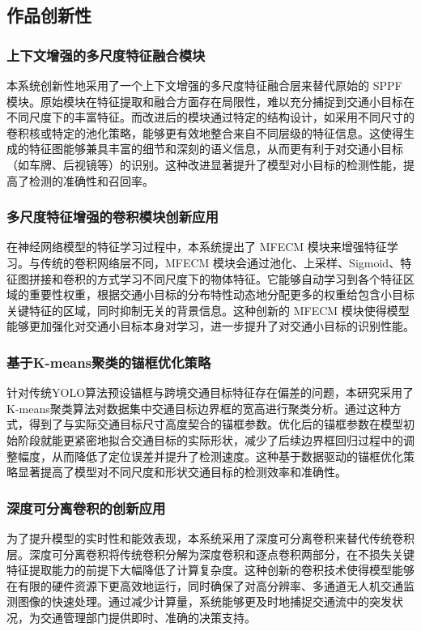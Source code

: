 \documentclass[runningheads]{llncs}
\begin{document}
\subsection{作品创新性}

\subsubsection{上下文增强的多尺度特征融合模块}
本系统创新性地采用了一个上下文增强的多尺度特征融合层来替代原始的 SPPF 模块。原始模块在特征提取和融合方面存在局限性，难以充分捕捉到交通小目标在不同尺度下的丰富特征。而改进后的模块通过特定的结构设计，如采用不同尺寸的卷积核或特定的池化策略，能够更有效地整合来自不同层级的特征信息。这使得生成的特征图能够兼具丰富的细节和深刻的语义信息，从而更有利于对交通小目标（如车牌、后视镜等）的识别。这种改进显著提升了模型对小目标的检测性能，提高了检测的准确性和召回率。

\subsubsection{多尺度特征增强的卷积模块创新应用}
在神经网络模型的特征学习过程中，本系统提出了 MFECM 模块来增强特征学习。与传统的卷积网络层不同，MFECM 模块会通过池化、上采样、Sigmoid、特征图拼接和卷积的方式学习不同尺度下的物体特征。它能够自动学习到各个特征区域的重要性权重，根据交通小目标的分布特性动态地分配更多的权重给包含小目标关键特征的区域，同时抑制无关的背景信息。这种创新的 MFECM 模块使得模型能够更加强化对交通小目标本身对学习，进一步提升了对交通小目标的识别性能。

\subsubsection{基于K-means聚类的锚框优化策略}
针对传统YOLO算法预设锚框与跨境交通目标特征存在偏差的问题，本研究采用了K-means聚类算法对数据集中交通目标边界框的宽高进行聚类分析。通过这种方式，得到了与实际交通目标尺寸高度契合的锚框参数。优化后的锚框参数在模型初始阶段就能更紧密地拟合交通目标的实际形状，减少了后续边界框回归过程中的调整幅度，从而降低了定位误差并提升了检测速度。这种基于数据驱动的锚框优化策略显著提高了模型对不同尺度和形状交通目标的检测效率和准确性。

\subsubsection{深度可分离卷积的创新应用}
为了提升模型的实时性和能效表现，本系统采用了深度可分离卷积来替代传统卷积层。深度可分离卷积将传统卷积分解为深度卷积和逐点卷积两部分，在不损失关键特征提取能力的前提下大幅降低了计算复杂度。这种创新的卷积技术使得模型能够在有限的硬件资源下更高效地运行，同时确保了对高分辨率、多通道无人机交通监测图像的快速处理。通过减少计算量，系统能够更及时地捕捉交通流中的突发状况，为交通管理部门提供即时、准确的决策支持。

 
 
\end{document}
